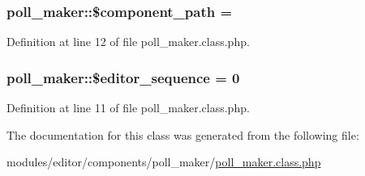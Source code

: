 \subsubsection[{\$component\+\_\+path}]{\setlength{\rightskip}{0pt plus 5cm}poll\+\_\+maker\+::\$component\+\_\+path = \textquotesingle{}\textquotesingle{}}\label{classpoll__maker_aed45da13a32668475091fceb3a3e526d}


Definition at line 12 of file poll\+\_\+maker.\+class.\+php.

\hypertarget{classpoll__maker_a17d99b5a9fe1df8e90cc572590e8a5e6}{}
\subsubsection[{\$editor\+\_\+sequence}]{\setlength{\rightskip}{0pt plus 5cm}poll\+\_\+maker\+::\$editor\+\_\+sequence = 0}\label{classpoll__maker_a17d99b5a9fe1df8e90cc572590e8a5e6}


Definition at line 11 of file poll\+\_\+maker.\+class.\+php.



The documentation for this class was generated from the following file\+:\begin{DoxyCompactItemize}
\item 
modules/editor/components/poll\+\_\+maker/\hyperlink{poll__maker_8class_8php}{poll\+\_\+maker.\+class.\+php}\end{DoxyCompactItemize}
